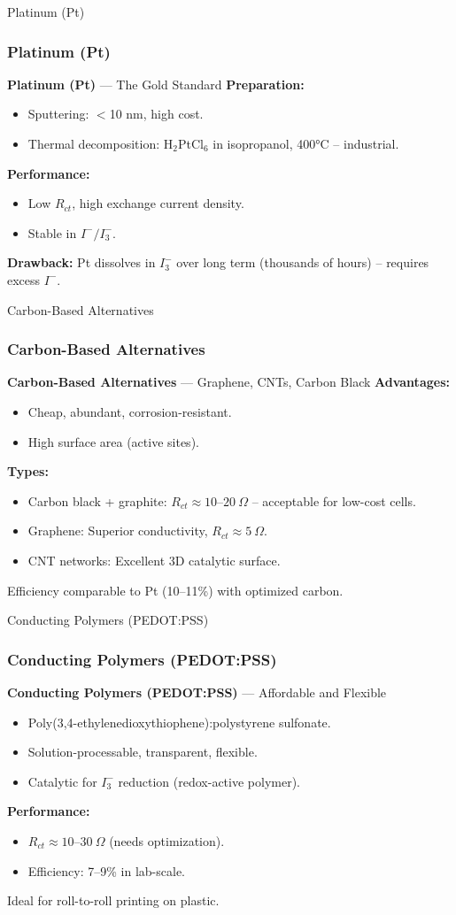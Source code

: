 \documentclass[aspectratio=169]{beamer}
\begin{document}
\begin{frame}{Platinum (Pt)}
\frametitle{Platinum (Pt)}

\textbf{Platinum (Pt)} — The Gold Standard
\textbf{Preparation:}
\begin{itemize}
\item Sputtering: $<$10 nm, high cost.
\item Thermal decomposition: H$_2$PtCl$_6$ in isopropanol, 400°C – industrial.
\end{itemize}
\textbf{Performance:}
\begin{itemize}
\item Low $R_{ct}$, high exchange current density.
\item Stable in $I^-/I_3^-$.
\end{itemize}
\textbf{Drawback:} Pt dissolves in $I_3^-$ over long term (thousands of hours) – requires excess $I^-$.
\cite{Olsen2000}
\end{frame}


\begin{frame}{Carbon-Based Alternatives}
\frametitle{Carbon-Based Alternatives}

\textbf{Carbon-Based Alternatives} — Graphene, CNTs, Carbon Black
\textbf{Advantages:}
\begin{itemize}
\item Cheap, abundant, corrosion-resistant.
\item High surface area (active sites).
\end{itemize}
\textbf{Types:}
\begin{itemize}
\item Carbon black + graphite: $R_{ct} \approx 10–20\ \Omega$ – acceptable for low-cost cells.
\item Graphene: Superior conductivity, $R_{ct} \approx 5\ \Omega$.
\item CNT networks: Excellent 3D catalytic surface.
\end{itemize}
Efficiency comparable to Pt (10–11\%) with optimized carbon.
\cite{Kavan2011}
\end{frame}


\begin{frame}{Conducting Polymers (PEDOT:PSS)}
\frametitle{Conducting Polymers (PEDOT:PSS)}

\textbf{Conducting Polymers (PEDOT:PSS)} — Affordable and Flexible
\begin{itemize}
\item Poly(3,4-ethylenedioxythiophene):polystyrene sulfonate.
\item Solution-processable, transparent, flexible.
\item Catalytic for $I_3^-$ reduction (redox-active polymer).
\end{itemize}
\textbf{Performance:}
\begin{itemize}
\item $R_{ct} \approx 10–30\ \Omega$ (needs optimization).
\item Efficiency: 7–9\% in lab-scale.
\end{itemize}
Ideal for roll-to-roll printing on plastic.
\cite{Yoo2012}
\end{frame}
\end{document}
